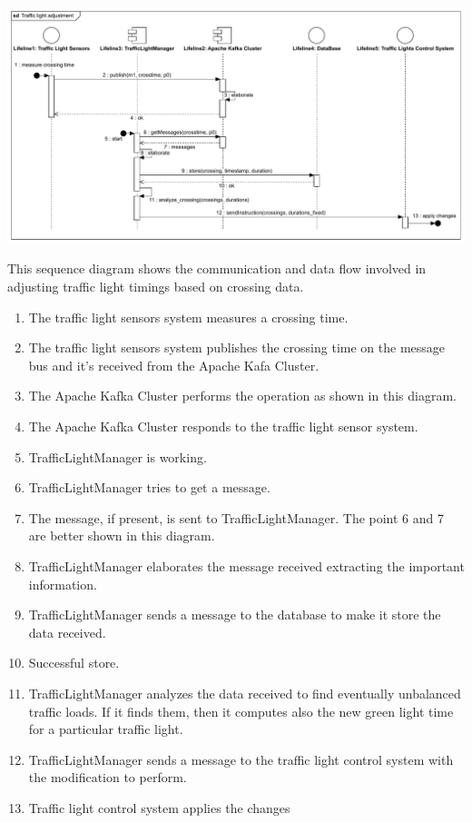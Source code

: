 \documentclass[12pt, a4paper, twoside, openright]{report}
\begin{document}
\includegraphics[width=\linewidth]{images/svg/traffic_light_adjustment.pdf}

This sequence diagram shows the communication and data flow involved in
adjusting traffic light timings based on crossing data.

\begin{enumerate}
\item
  The traffic light sensors system measures a crossing time.
\item
  The traffic light sensors system publishes the crossing time on the
  message bus and it's received from the Apache Kafa Cluster.
\item
  The Apache Kafka Cluster performs the operation as shown in this
  diagram.
\item
  The Apache Kafka Cluster responds to the traffic light sensor system.
\item
  TrafficLightManager is working.
\item
  TrafficLightManager tries to get a message.
\item
  The message, if present, is sent to TrafficLightManager. The point 6
  and 7 are better shown in this diagram.
\item
  TrafficLightManager elaborates the message received extracting the
  important information.
\item
  TrafficLightManager sends a message to the database to make it store
  the data received.
\item
  Successful store.
\item
  TrafficLightManager analyzes the data received to find eventually
  unbalanced traffic loads. If it finds them, then it computes also the
  new green light time for a particular traffic light.
\item
  TrafficLightManager sends a message to the traffic light control
  system with the modification to perform.
\item
  Traffic light control system applies the changes
\end{enumerate}
\end{document}
